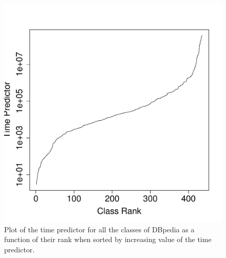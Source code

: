 \documentclass{sig-alternate}
\begin{document}
\begin{figure}[t]
\begin{center}
  \includegraphics[height=\plotheight]{tp}
\end{center}
\caption{Plot of the time predictor for all the classes of DBpedia as a function of
  their rank when sorted by increasing value of the time predictor.}
\label{fig:tp}
\end{figure}


\end{document}
